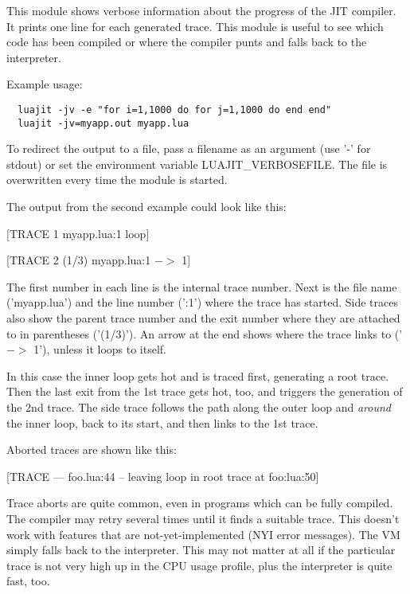 
This module shows verbose information about the progress of the
JIT compiler. It prints one line for each generated trace. This module
is useful to see which code has been compiled or where the compiler
punts and falls back to the interpreter.

Example usage:

\begin{lstlisting}
  luajit -jv -e "for i=1,1000 do for j=1,1000 do end end"
  luajit -jv=myapp.out myapp.lua
\end{lstlisting}
To redirect the output to a file, pass a
filename as an argument (use '-' for stdout) or set the environment
variable LUAJIT\_VERBOSEFILE. The file is overwritten every time the
module is started.

The output from the second example could look like this:

\begin{center}
[TRACE   1 myapp.lua:1 loop]

[TRACE   2 (1/3) myapp.lua:1 $->$ 1]
\end{center}

The first number in each line is the internal trace number. Next is
the file name ('myapp.lua') and the line number (':1') where the
trace has started. Side traces also show the parent trace number and
the exit number where they are attached to in parentheses ('(1/3)').
An arrow at the end shows where the trace links to ('$->$ 1'), unless
it loops to itself.

In this case the inner loop gets hot and is traced first, generating
a root trace. Then the last exit from the 1st trace gets hot, too,
and triggers the generation of the 2nd trace. The side trace follows the
path along the outer loop and \textit{around} the inner loop, back to its
start, and then links to the 1st trace.

Aborted traces are shown like this:
\begin{center}
[TRACE --- foo.lua:44 -- leaving loop in root trace at foo:lua:50]
\end{center}

Trace aborts are quite common, even in programs which
can be fully compiled. The compiler may retry several times until it
finds a suitable trace. This doesn't work with features that are
not-yet-implemented (NYI error messages). The VM simply falls back to the
interpreter. This may not matter at all if the particular trace is not very high
up in the CPU usage profile, plus the interpreter is quite fast, too.